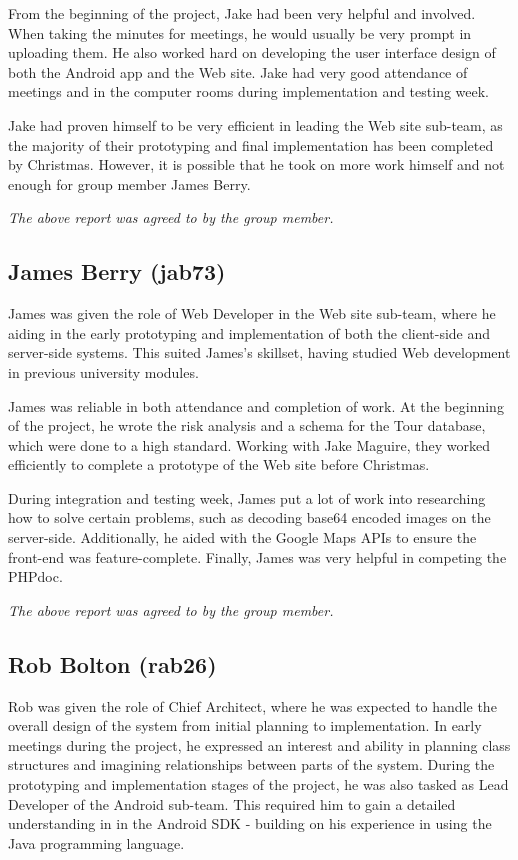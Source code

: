 \documentclass{project}
\begin{document}
From the beginning of the project, Jake had been very helpful and involved. When taking the minutes for meetings, he would usually be very prompt in uploading them. He also worked hard on developing the user interface design of both the Android app and the Web site. Jake had very good attendance of meetings and in the computer rooms during implementation and testing week.

Jake had proven himself to be very efficient in leading the Web site sub-team, as the majority of their prototyping and final implementation has been completed by Christmas. However, it is possible that he took on more work himself and not enough for group member James Berry.

\emph{The above report was agreed to by the group member.}


\subsection{James Berry (jab73)}
James was given the role of Web Developer in the Web site sub-team, where he aiding in the early prototyping and implementation of both the client-side and server-side systems. This suited James's skillset, having studied Web development in previous university modules.

James was reliable in both attendance and completion of work. At the beginning of the project, he wrote the risk analysis and a schema for the Tour database, which were done to a high standard. Working with Jake Maguire, they worked efficiently to complete a prototype of the Web site before Christmas.

During integration and testing week, James put a lot of work into researching how to solve certain problems, such as decoding base64 encoded images on the server-side. Additionally, he aided with the Google Maps APIs to ensure the front-end was feature-complete. Finally, James was very helpful in competing the PHPdoc.

\emph{The above report was agreed to by the group member.}


\subsection{Rob Bolton (rab26)}
Rob was given the role of Chief Architect, where he was expected to handle the overall design of the system from initial planning to implementation. In early meetings during the project, he expressed an interest and ability in planning class structures and imagining relationships between parts of the system. During the prototyping and implementation stages of the project, he was also tasked as Lead Developer of the Android sub-team. This required him to gain a detailed understanding in in the Android SDK - building on his experience in using the Java programming language.
\end{document}
